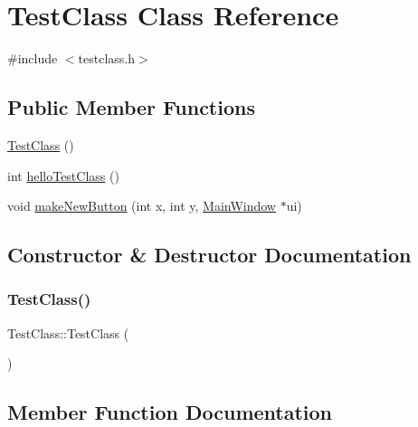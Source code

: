 \hypertarget{class_test_class}{}\section{Test\+Class Class Reference}
\label{class_test_class}


{\ttfamily \#include $<$testclass.\+h$>$}

\subsection*{Public Member Functions}
\begin{DoxyCompactItemize}
\item 
\mbox{\hyperlink{class_test_class_a09903432ed60c7c38f1beccc4cf18987}{Test\+Class}} ()
\item 
int \mbox{\hyperlink{class_test_class_a842a304e200248cadf04d06126b51124}{hello\+Test\+Class}} ()
\item 
void \mbox{\hyperlink{class_test_class_aea6363a0f95a01e45d2850ece2e00b9e}{make\+New\+Button}} (int x, int y, \mbox{\hyperlink{class_main_window}{Main\+Window}} $\ast$ui)
\end{DoxyCompactItemize}


\subsection{Constructor \& Destructor Documentation}
\mbox{\label{class_test_class_a09903432ed60c7c38f1beccc4cf18987}} 
\subsubsection{\texorpdfstring{Test\+Class()}{TestClass()}}
{\footnotesize\ttfamily Test\+Class\+::\+Test\+Class (\begin{DoxyParamCaption}{ }\end{DoxyParamCaption})}



\subsection{Member Function Documentation}
\mbox{\label{class_test_class_a842a304e200248cadf04d06126b51124}} 
